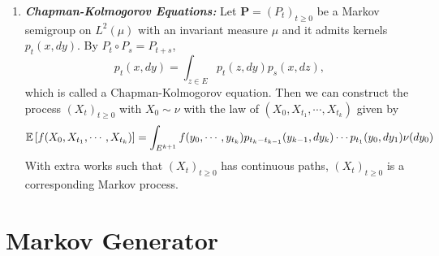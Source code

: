 \begin{enumerate}[label=\arabic{*}.]
	\item \textbf{\emph{Chapman-Kolmogorov Equations:}} Let $\mathbf{P} = (P_t)_{t \geq 0}$ be a Markov semigroup on $L^2(\mu)$ with an invariant measure $\mu$ and it admits kernels $p_t(x,dy)$. By $P_t \circ P_s = P_{t+s}$,
	\begin{equation*}
		p_t(x,dy) = \int_{z \in E} p_t(z,dy)p_s(x,dz),
	\end{equation*}
	which is called a Chapman-Kolmogorov equation. Then we can construct the process $(X_t)_{t \geq 0}$ with $X_0 \sim \nu$ with the law of $(X_0,X_{t_1},\cdots,X_{t_k})$ given by
	\begin{equation*}
		\mathbb{E}\left[f(X_0,X_{t_1},\cdots,X_{t_k})\right] = \int_{E^{k+1}} f(y_0,\cdots,y_{t_k})p_{t_k-t_{k-1}}(y_{k-1},dy_k) \cdots p_{t_1}(y_0,dy_1)\nu(dy_0)
	\end{equation*}
	With extra works such that $(X_t)_{t \geq 0}$ has continuous paths, $(X_t)_{t \geq 0}$ is a corresponding Markov process.
\end{enumerate}

\section{Markov Generator}

